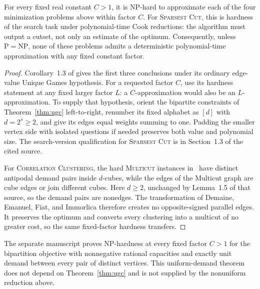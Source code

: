 \begin{corollary}
\label{cor:cut-clustering}
For every fixed real constant \(C>1\), it is NP-hard to approximate
each of the four minimization problems above within factor \(C\).
For \textsc{Sparsest Cut}, this is hardness of the search task under
polynomial-time Cook reductions: the algorithm must output a cutset,
not only an estimate of the optimum. Consequently, unless
\(\mathrm P=\mathrm{NP}\), none of these problems admits a deterministic
polynomial-time approximation with any fixed constant factor.
\end{corollary}
\begin{proof}
Corollary~1.3 of \cite{CKKRS2006} gives the first three conclusions
under its ordinary edge-value Unique Games hypothesis.
For a requested factor \(C\), use its hardness statement at any fixed
larger factor \(L\): a \(C\)-approximation would also be an
\(L\)-approximation.
To supply that hypothesis, orient the bipartite constraints of
Theorem~\ref{thm:ugc} left-to-right, renumber its fixed alphabet as
\([d]\) with \(d=2^s\ge2\), and give its edges equal weights summing
to one. Padding the smaller vertex side with isolated questions if
needed preserves both value and polynomial size. The search-version
qualification for \textsc{Sparsest Cut} is in Section~1.3 of the
cited source.

For \textsc{Correlation Clustering}, the hard \textsc{Multicut}
instances in~\cite[Section~2.1]{CKKRS2006} have distinct antipodal
demand pairs inside \(d\)-cubes, while the edges of the Multicut graph
are cube edges or join different cubes. Here \(d\ge2\), unchanged by
Lemma~1.5 of
that source, so the demand pairs are nonedges. The transformation of
Demaine, Emanuel, Fiat, and Immorlica
\cite[Theorem~4.7 and Corollary~4.8]{DemaineEtAl2006Clustering}
therefore creates no opposite-signed parallel edges. It preserves the
optimum and converts every clustering into a multicut of no greater
cost, so the same fixed-factor hardness transfers.
\end{proof}

The separate manuscript
\cite[Theorem~1.1]{OpenAIUniformSparsest2026} proves
NP-hardness at every fixed factor \(C>1\) for the bipartition objective with
nonnegative rational capacities and exactly unit demand between every
pair of distinct vertices. This uniform-demand theorem does not depend on
Theorem~\ref{thm:ugc} and is not supplied by the nonuniform reduction
above.

